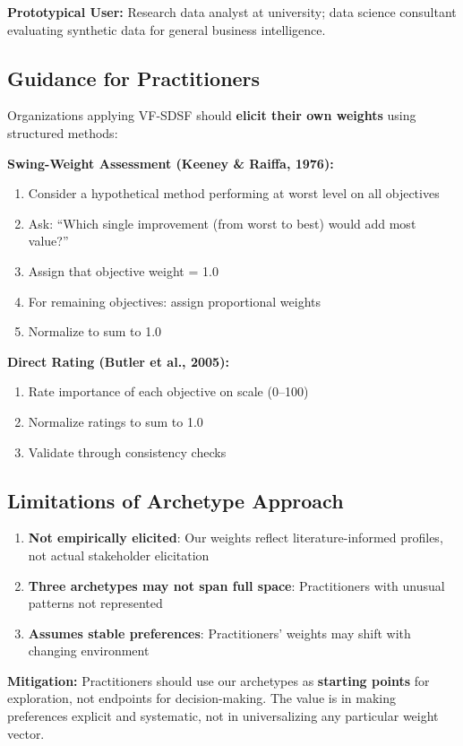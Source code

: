 \documentclass[12pt,a4paper]{article}
\begin{document}
\textbf{Prototypical User:} Research data analyst at university; data science consultant evaluating synthetic data for general business intelligence.

\subsection{Guidance for Practitioners}

Organizations applying VF-SDSF should \textbf{elicit their own weights} using structured methods:

\textbf{Swing-Weight Assessment (Keeney \& Raiffa, 1976):}
\begin{enumerate}
    \item Consider a hypothetical method performing at worst level on all objectives
    \item Ask: ``Which single improvement (from worst to best) would add most value?''
    \item Assign that objective weight = 1.0
    \item For remaining objectives: assign proportional weights
    \item Normalize to sum to 1.0
\end{enumerate}

\textbf{Direct Rating (Butler et al., 2005):}
\begin{enumerate}
    \item Rate importance of each objective on scale (0--100)
    \item Normalize ratings to sum to 1.0
    \item Validate through consistency checks
\end{enumerate}

\subsection{Limitations of Archetype Approach}

\begin{enumerate}
    \item \textbf{Not empirically elicited}: Our weights reflect literature-informed profiles, not actual stakeholder elicitation
    \item \textbf{Three archetypes may not span full space}: Practitioners with unusual patterns not represented
    \item \textbf{Assumes stable preferences}: Practitioners' weights may shift with changing environment
\end{enumerate}

\textbf{Mitigation:} Practitioners should use our archetypes as \textbf{starting points} for exploration, not endpoints for decision-making. The value is in making preferences explicit and systematic, not in universalizing any particular weight vector.
\end{document}

